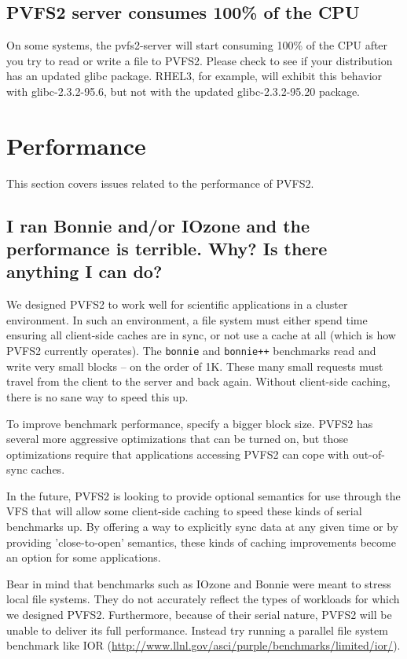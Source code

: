 \documentclass[11pt,letterpaper]{article}
\begin{document}
\subsection{PVFS2 server consumes 100\% of the CPU}

On some systems, the pvfs2-server will start consuming 100\% of the
CPU after you try to read or write a file to PVFS2.  Please check to
see if your distribution has an updated glibc package.  RHEL3, for
example, will exhibit this behavior with glibc-2.3.2-95.6, but not
with the updated glibc-2.3.2-95.20 package.

%
%
\section{Performance}

This section covers issues related to the performance of PVFS2.

\subsection{I ran Bonnie and/or IOzone and the performance is terrible.
Why? Is there anything I can do?}
\label{sec:badperf}

We designed PVFS2 to work well for scientific applications in a cluster
environment.  In such an environment, a file system must either spend
time ensuring all client-side caches are in sync, or not use a cache
at all (which is how PVFS2 currently operates).  The \texttt{bonnie}
and \texttt{bonnie++} benchmarks read and write very small blocks --
on the order of 1K.  These many small requests must travel from the
client to the server and back again.  Without client-side caching,
there is no sane way to speed this up.

To improve benchmark performance, specify a bigger block size.   PVFS2
has several more aggressive optimizations that can be turned on, but
those optimizations require that applications accessing PVFS2 can cope
with out-of-sync caches.  

In the future, PVFS2 is looking to provide optional semantics for use
through the VFS that will allow some client-side caching to speed these
kinds of serial benchmarks up.  By offering a way to explicitly sync
data at any given time or by providing 'close-to-open' semantics, these
kinds of caching improvements become an option for some applications.

Bear in mind that benchmarks such as IOzone and Bonnie were meant to
stress local file systems.   They do not accurately reflect the types of
workloads for which we designed PVFS2.  Furthermore, because of their
serial nature, PVFS2 will be unable to deliver its full performance.
Instead try running a parallel file system benchmark like IOR
(\url{http://www.llnl.gov/asci/purple/benchmarks/limited/ior/}).
\end{document}
